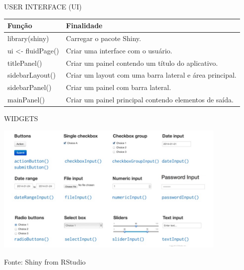 \documentclass[
  ignorenonframetext,
]{beamer}
\begin{document}
\begin{frame}{USER INTERFACE (UI)}
\protect\hypertarget{user-interface-ui}{}

\begin{table}
\begin{tabular}{l | l}
Função & Finalidade \\
\hline \hline
library(shiny) & \small Carregar o pacote Shiny. \\
ui <- fluidPage() & \small Criar uma interface com o usuário. \\
titlePanel() & \small Criar um painel contendo um título do aplicativo. \\
sidebarLayout() & \small Criar um layout com uma barra lateral e área principal. \\
sidebarPanel() & \small Criar um painel com barra lateral. \\
mainPanel() & \small Criar um painel principal contendo elementos de saída. \\
\end{tabular}
\end{table}

\end{frame}

\begin{frame}{WIDGETS}
\protect\hypertarget{widgets}{}

\includegraphics[width=4.4in]{imagens/inpfun}

\begin{center}
\tiny{Fonte: Shiny from RStudio}
\end{center}

\end{frame}
\end{document}
